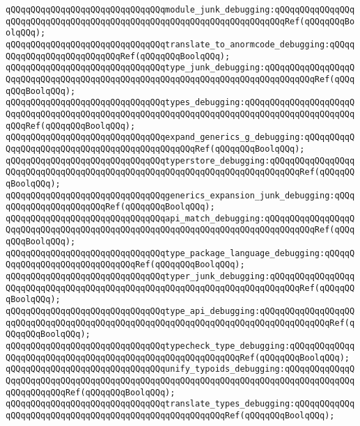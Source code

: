 \verb|qQQqqQQqqQQqqQQqqQQqqQQqqQQqqQQqmodule_junk_debugging:qQQqqQQqqQQqqQQqqQQqqQQqqQQqqQQqqQQqqQQqqQQqqQQqqQQqqQQqqQQqqQQqqQQqqQQqRef(qQQqqQQqBoolqQQq);|\newline
\verb|qQQqqQQqqQQqqQQqqQQqqQQqqQQqqQQqtranslate_to_anormcode_debugging:qQQqqQQqqQQqqQQqqQQqqQQqqQQqRef(qQQqqQQqBoolqQQq);|\newline
\verb|qQQqqQQqqQQqqQQqqQQqqQQqqQQqqQQqtype_junk_debugging:qQQqqQQqqQQqqQQqqQQqqQQqqQQqqQQqqQQqqQQqqQQqqQQqqQQqqQQqqQQqqQQqqQQqqQQqqQQqqQQqRef(qQQqqQQqBoolqQQq);|\newline
\verb|qQQqqQQqqQQqqQQqqQQqqQQqqQQqqQQqtypes_debugging:qQQqqQQqqQQqqQQqqQQqqQQqqQQqqQQqqQQqqQQqqQQqqQQqqQQqqQQqqQQqqQQqqQQqqQQqqQQqqQQqqQQqqQQqqQQqqQQqRef(qQQqqQQqBoolqQQq);|\newline
\verb|qQQqqQQqqQQqqQQqqQQqqQQqqQQqqQQqexpand_generics_g_debugging:qQQqqQQqqQQqqQQqqQQqqQQqqQQqqQQqqQQqqQQqqQQqqQQqRef(qQQqqQQqBoolqQQq);|\newline
\verb|qQQqqQQqqQQqqQQqqQQqqQQqqQQqqQQqtyperstore_debugging:qQQqqQQqqQQqqQQqqQQqqQQqqQQqqQQqqQQqqQQqqQQqqQQqqQQqqQQqqQQqqQQqqQQqqQQqqQQqRef(qQQqqQQqBoolqQQq);|\newline
\verb|qQQqqQQqqQQqqQQqqQQqqQQqqQQqqQQqgenerics_expansion_junk_debugging:qQQqqQQqqQQqqQQqqQQqqQQqRef(qQQqqQQqBoolqQQq);|\newline
\verb|qQQqqQQqqQQqqQQqqQQqqQQqqQQqqQQqapi_match_debugging:qQQqqQQqqQQqqQQqqQQqqQQqqQQqqQQqqQQqqQQqqQQqqQQqqQQqqQQqqQQqqQQqqQQqqQQqqQQqqQQqRef(qQQqqQQqBoolqQQq);|\newline
\verb|qQQqqQQqqQQqqQQqqQQqqQQqqQQqqQQqtype_package_language_debugging:qQQqqQQqqQQqqQQqqQQqqQQqqQQqqQQqRef(qQQqqQQqBoolqQQq);|\newline
\verb|qQQqqQQqqQQqqQQqqQQqqQQqqQQqqQQqtyper_junk_debugging:qQQqqQQqqQQqqQQqqQQqqQQqqQQqqQQqqQQqqQQqqQQqqQQqqQQqqQQqqQQqqQQqqQQqqQQqqQQqRef(qQQqqQQqBoolqQQq);|\newline
\verb|qQQqqQQqqQQqqQQqqQQqqQQqqQQqqQQqtype_api_debugging:qQQqqQQqqQQqqQQqqQQqqQQqqQQqqQQqqQQqqQQqqQQqqQQqqQQqqQQqqQQqqQQqqQQqqQQqqQQqqQQqqQQqRef(qQQqqQQqBoolqQQq);|\newline
\verb|qQQqqQQqqQQqqQQqqQQqqQQqqQQqqQQqtypecheck_type_debugging:qQQqqQQqqQQqqQQqqQQqqQQqqQQqqQQqqQQqqQQqqQQqqQQqqQQqqQQqqQQqRef(qQQqqQQqBoolqQQq);|\newline
\verb|qQQqqQQqqQQqqQQqqQQqqQQqqQQqqQQqunify_typoids_debugging:qQQqqQQqqQQqqQQqqQQqqQQqqQQqqQQqqQQqqQQqqQQqqQQqqQQqqQQqqQQqqQQqqQQqqQQqqQQqqQQqqQQqqQQqqQQqqQQqRef(qQQqqQQqBoolqQQq);|\newline
\verb|qQQqqQQqqQQqqQQqqQQqqQQqqQQqqQQqtranslate_types_debugging:qQQqqQQqqQQqqQQqqQQqqQQqqQQqqQQqqQQqqQQqqQQqqQQqqQQqqQQqRef(qQQqqQQqBoolqQQq);|\newline
